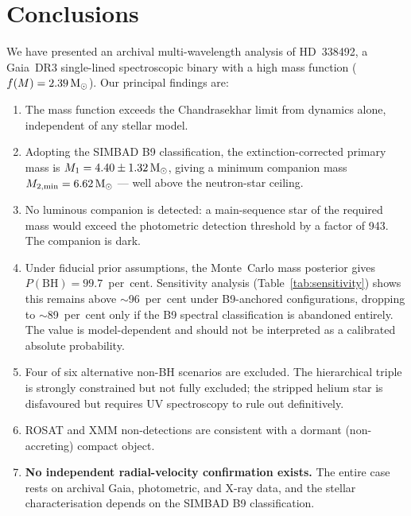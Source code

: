 \documentclass[usenatbib,fleqn]{mnras}
\newcommand{\Msun}{{\rm M}_\odot}
\newcommand{\fmass}{f(M)}
\begin{document}
\section{Conclusions}
\label{sec:conclusions}

We have presented an archival multi-wavelength analysis of
HD~338492, a Gaia~DR3 single-lined spectroscopic binary with a
high mass function ($\fmass = 2.39\,\Msun$).  Our principal findings
are:

\begin{enumerate}
\item The mass function exceeds the Chandrasekhar limit from
  dynamics alone, independent of any stellar model.
  
\item Adopting the SIMBAD B9 classification, the
  extinction-corrected primary mass is
  $M_1 = 4.40 \pm 1.32\,\Msun$, giving a minimum companion mass
  $M_{2,\min} = 6.62\,\Msun$ --- well above the neutron-star
  ceiling.
  
\item No luminous companion is detected: a main-sequence star of
  the required mass would exceed the photometric detection
  threshold by a factor of 943.  The companion is dark.
  
\item Under fiducial prior assumptions, the Monte~Carlo mass
  posterior gives $P(\text{BH}) = 99.7$~per~cent.  Sensitivity
  analysis (Table~\ref{tab:sensitivity}) shows this remains
  above $\sim$96~per~cent under B9-anchored configurations,
  dropping to $\sim$89~per~cent only if the B9 spectral
  classification is abandoned entirely.  The value is
  model-dependent and should not
  be interpreted as a calibrated absolute probability.
  
\item Four of six alternative non-BH scenarios are excluded.
  The hierarchical triple is strongly constrained but not fully
  excluded; the stripped helium star is disfavoured but requires
  UV spectroscopy to rule out definitively.
  
\item ROSAT and XMM non-detections are consistent with a
  dormant (non-accreting) compact object.
  
\item \textbf{No independent radial-velocity confirmation exists.}
  The entire case rests on archival Gaia, photometric, and X-ray
  data, and the stellar characterisation depends on the SIMBAD B9
  classification.
\end{enumerate}
\end{document}
